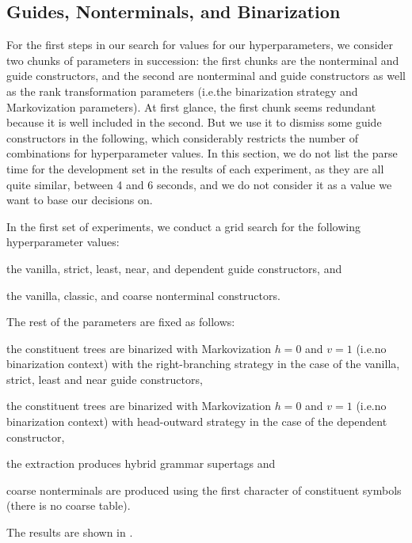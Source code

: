 \documentclass[../../document.tex]{subfiles}
\begin{document}
    \subsection{Guides, Nonterminals, and Binarization}\label{sec:gridsearch:nts-guides}
    For the first steps in our search for values for our hyperparameters, we consider two chunks of parameters in succession: the first chunks are the nonterminal and guide constructors, and the second are nonterminal and guide constructors as well as the rank transformation parameters (i.e.\@ the binarization strategy and Markovization parameters).
    At first glance, the first chunk seems redundant because it is well included in the second.
    But we use it to dismiss some guide constructors in the following, which considerably restricts the number of combinations for hyperparameter values.
    In this section, we do not list the parse time for the development set in the results of each experiment, as they are all quite similar, between 4 and 6 seconds, and we do not consider it as a value we want to base our decisions on.

    In the first set of experiments, we conduct a grid search for the following hyperparameter values:
    \begin{compactitem}
        \item the vanilla, strict, least, near, and dependent guide constructors, and
        \item the vanilla, classic, and coarse nonterminal constructors.
    \end{compactitem}
    The rest of the parameters are fixed as follows:
    \begin{compactitem}
        \item the constituent trees are binarized with Markovization \(h=0\) and \(v=1\) (i.e.\@ no binarization context) with the right-branching strategy in the case of the vanilla, strict, least and near guide constructors,
        \item the constituent trees are binarized with Markovization \(h=0\) and \(v=1\) (i.e.\@ no binarization context) with head-outward strategy in the case of the dependent constructor,
        \item the extraction produces hybrid grammar supertags and
        \item coarse nonterminals are produced using the first character of constituent symbols (there is no coarse table).
    \end{compactitem}
    The results are shown in .
\end{document}

